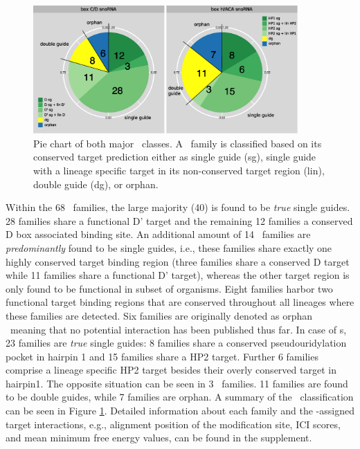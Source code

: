 \begin{figure}
  \centering
  \includegraphics[width=0.9\textwidth]{pics/pieCharts_snoRNAs_modified.eps}
  \caption[Classification of \sno\ families as single or double
  guides.]{Pie chart of both major \sno\ classes. A \sno\ family is
    classified based on its conserved target prediction either as
    single guide (sg), single guide with a lineage specific target in
    its non-conserved target region (lin), double guide (dg), or
    orphan.}
  \label{fig:pie_charts}
\end{figure}

Within the 68 \cd\ families, the large majority (40) is found to be
\textit{true} single guides. 28 families share a functional D' target
and the remaining 12 families a conserved D box associated binding
site. An additional amount of 14 \cd\ families are
\textit{predominantly} found to be single guides, i.e., these families
share exactly one highly conserved target binding region (three
families share a conserved D target while 11 families share a
functional D' target), whereas the other target region is only found
to be functional in subset of organisms. Eight families harbor two
functional target binding regions that are conserved throughout all
lineages where these families are detected.  Six families are
originally denoted as orphan \sno\ meaning that no potential
interaction has been published thus far. In case of \haca s, 23
families are \textit{true} single guides: 8 families share a conserved
pseudouridylation pocket in hairpin 1 and 15 families share a HP2
target. Further 6 families comprise a lineage specific HP2 target
besides their overly conserved target in hairpin1. The opposite
situation can be seen in 3 \haca\ families. 11 families are found to
be double guides, while 7 families are orphan. A summary of the \sno\
classification can be seen in Figure \ref{fig:pie_charts}.  Detailed
information about each family and the \snostrip-assigned target
interactions, e.g., alignment position of the modification site, ICI
scores, and mean minimum free energy values, can be found in the
supplement.


